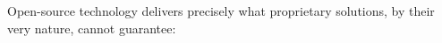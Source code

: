 Open-source technology delivers precisely what proprietary solutions, by their very nature, cannot guarantee:

